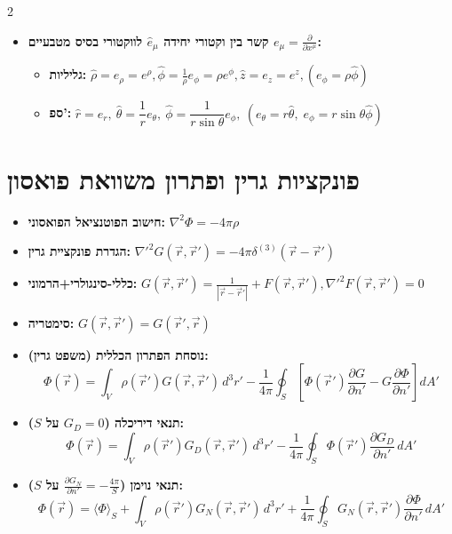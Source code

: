 \documentclass[10pt,a4paper]{article}
\begin{document}
\begin{multicols*}{2}
\begin{itemize}
    \item \textbf{קשר בין וקטורי יחידה $\hat{e}_\mu$ לווקטורי בסיס מטבעיים $e_\mu = \frac{\partial}{\partial x^\mu}$:}
\begin{itemize}
    \item \textbf{גליליות:} $\hat{\rho} = e_\rho = e^\rho, \hat{\phi} = \frac{1}{\rho} e_\phi = \rho e^\phi, \hat{z} = e_z = e^z, \left(e_\phi = \rho \hat{\phi}\right)$
    \item \textbf{ספ':} $\hat{r} = e_r, \ \hat{\theta} = \dfrac{1}{r} e_\theta, \ \hat{\phi} = \dfrac{1}{r \sin\theta} e_\phi, \ \left(e_\theta = r\hat{\theta}, \; e_\phi = r\sin\theta \hat{\phi}\right)$
\end{itemize}
\end{itemize}


\section{פונקציות גרין ופתרון משוואת פואסון}
\begin{itemize}
    \item \textbf{חישוב הפוטנציאל הפואסוני:} $\nabla^2 \Phi = -4\pi \rho$
    \item \textbf{הגדרת פונקציית גרין:} $\nabla'^2 G(\vec{r}, \vec{r}') = -4\pi \delta^{(3)}(\vec{r} - \vec{r}')$
    \item \textbf{כללי-סינגולרי+הרמוני:}
    {\small$
    G(\vec{r}, \vec{r}') = \frac{1}{|\vec{r} - \vec{r}'|} + F(\vec{r}, \vec{r}'), \nabla'^2 F(\vec{r}, \vec{r}') = 0
    $}
    \item \textbf{סימטריה:} $G(\vec{r}, \vec{r}') = G(\vec{r}', \vec{r})$
    \item \textbf{נוסחת הפתרון הכללית (משפט גרין):}
    \[
    \Phi(\vec{r}) = \int_V \rho(\vec{r}') G(\vec{r}, \vec{r}') \, d^3r' - \frac{1}{4\pi} \oint_S \left[ \Phi(\vec{r}') \frac{\partial G}{\partial n'} - G \frac{\partial \Phi}{\partial n'} \right] dA'
    \]
    \item \textbf{תנאי דיריכלה ($G_D = 0$ על $S$):}
    \[
    \Phi(\vec{r}) = \int_V \rho(\vec{r}') G_D(\vec{r}, \vec{r}') \, d^3r' - \frac{1}{4\pi} \oint_S \Phi(\vec{r}') \frac{\partial G_D}{\partial n'} \, dA'
    \]
    \item \textbf{תנאי נוימן ($\frac{\partial G_N}{\partial n'} = -\frac{4\pi}{S}$ על $S$):}
    \[
    \Phi(\vec{r}) = \langle \Phi \rangle_S + \int_V \rho(\vec{r}') G_N(\vec{r}, \vec{r}') \, d^3r' + \frac{1}{4\pi} \oint_S G_N(\vec{r}, \vec{r}') \frac{\partial \Phi}{\partial n'} \, dA'
    \]
\end{itemize}


\end{multicols*}
\end{document}
